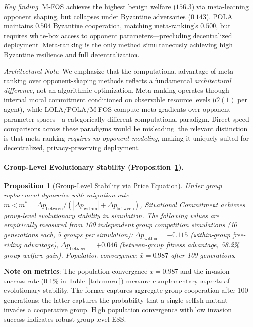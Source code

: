 \documentclass{article}
\newtheorem{proposition}{Proposition}
\begin{document}
\noindent\textit{Key finding}: M-FOS achieves the highest benign welfare ($156.3$) via meta-learning opponent shaping, but collapses under Byzantine adversaries ($0.143$).
POLA maintains $0.504$ Byzantine cooperation, matching meta-ranking's $0.500$, but requires white-box access to opponent parameters---precluding decentralized deployment.
Meta-ranking is the only method simultaneously achieving high Byzantine resilience and full decentralization.

\noindent\textit{Architectural Note}: We emphasize that the computational advantage of meta-ranking over opponent-shaping methods reflects a fundamental \emph{architectural difference}, not an algorithmic optimization.
Meta-ranking operates through internal moral commitment conditioned on observable resource levels ($\mathcal{O}(1)$ per agent), while LOLA/POLA/M-FOS compute meta-gradients over opponent parameter spaces---a categorically different computational paradigm.
Direct speed comparisons across these paradigms would be misleading; the relevant distinction is that meta-ranking \emph{requires no opponent modeling}, making it uniquely suited for decentralized, privacy-preserving deployment.

\paragraph{Group-Level Evolutionary Stability (Proposition~\ref{thm:group_ess}).}

\begin{proposition}[Group-Level Stability via Price Equation]
\label{thm:group_ess}
Under group replacement dynamics with migration rate $m < m^* = \Delta p_{\text{between}} / (|\Delta p_{\text{within}}| + \Delta p_{\text{between}})$, Situational Commitment achieves group-level evolutionary stability in simulation. The following values are empirically measured from 100 independent group competition simulations (10 generations each, 5 groups per simulation):
$\Delta p_{\text{within}} = -0.115$ (within-group free-riding advantage),
$\Delta p_{\text{between}} = +0.046$ (between-group fitness advantage, 58.2\% group welfare gain).
Population convergence: $\bar{x} = 0.987$ after 100 generations.
\end{proposition}

\noindent \textbf{Note on metrics}: The population convergence $\bar{x} = 0.987$ and the invasion success rate (0.1\% in Table~\ref{tab:moral}) measure complementary aspects of evolutionary stability.
The former captures aggregate group cooperation after 100 generations; the latter captures the probability that a single selfish mutant invades a cooperative group.
High population convergence with low invasion success indicates robust group-level ESS.
\end{document}
